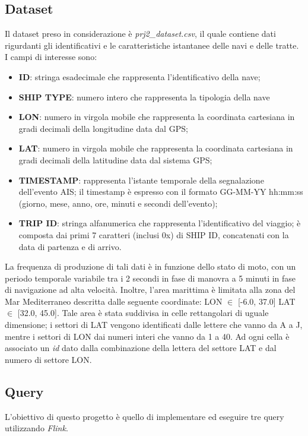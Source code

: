 \documentclass[conference]{IEEEtran}
\begin{document}
\subsection*{\textbf{Dataset}} 
Il dataset preso in considerazione \`{e} \textit{prj2\_dataset.csv}, il quale contiene dati rigurdanti gli identificativi e le caratteristiche istantanee delle navi e delle tratte. I campi di interesse sono:
\begin{itemize}
\item \textbf{ID}: stringa esadecimale che rappresenta l’identificativo della nave;
\item \textbf{SHIP TYPE}: numero intero che rappresenta la tipologia della nave
\item \textbf{LON}: numero in virgola mobile che rappresenta la coordinata cartesiana in gradi decimali della
longitudine data dal GPS;
\item \textbf{LAT}: numero in virgola mobile che rappresenta la coordinata cartesiana in gradi decimali della latitudine data dal sistema GPS;
\item \textbf{TIMESTAMP}: rappresenta l’istante temporale della segnalazione dell’evento AIS; il timestamp è
espresso con il formato GG-MM-YY hh:mm:ss (giorno, mese, anno, ore, minuti e secondi dell’evento);
\item \textbf{TRIP ID}: stringa alfanumerica che rappresenta l’identificativo del viaggio; è composta dai primi 7
caratteri (inclusi 0x) di SHIP ID, concatenati con la data di partenza e di arrivo.
\end{itemize}
\par La
frequenza di produzione di tali dati è in funzione dello stato di moto, con un periodo temporale variabile tra i 2 secondi in fase di manovra a 5 minuti in fase di navigazione ad alta velocità. Inoltre, l'area marittima è limitata alla zona del Mar Mediterraneo descritta dalle seguente coordinate: LON $\in$ [-6.0, 37.0] LAT $\in$ [32.0, 45.0].
Tale area è stata suddivisa in celle rettangolari di uguale dimensione; i settori di LAT vengono identificati dalle lettere che vanno da A a J, mentre i settori di LON dai numeri interi che vanno da 1 a 40. Ad ogni cella è associato un \emph{id} dato dalla combinazione della lettera del
settore LAT e dal numero di settore LON.
\subsection*{\textbf{Query}}
L'obiettivo di questo progetto \`{e} quello di implementare ed eseguire tre query utilizzando \emph{Flink}.
\end{document}

